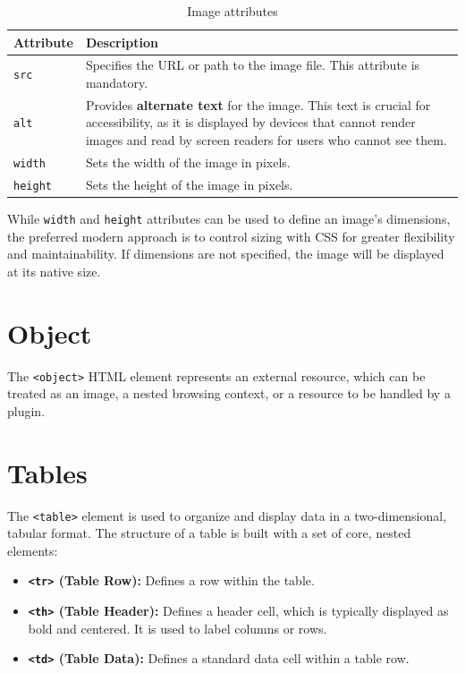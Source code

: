 \documentclass{scrbook}
\begin{document}
\begin{table}[h!]
    \centering
    \begin{tabularx}{\textwidth}{|p{5em}|X|} \hline
        \textbf{Attribute} & \textbf{Description} \\ \hline
    
        \texttt{src} & Specifies the URL or path to the image file. This attribute is mandatory. \\ \hline
    
        \texttt{alt} & Provides \textbf{alternate text} for the image. This text is crucial for accessibility, as it is displayed by devices that cannot render images and read by screen readers for users who cannot see them. \\ \hline
    
        \texttt{width} & Sets the width of the image in pixels. \\ \hline
    
        \texttt{height} & Sets the height of the image in pixels. \\ \hline
    \end{tabularx}
    \caption{Image attributes}
\end{table}

While \texttt{width} and \texttt{height} attributes can be used to define an image's dimensions, the preferred modern approach is to control sizing with CSS for greater flexibility and maintainability. If dimensions are not specified, the image will be displayed at its native size.

\section{Object}

The \texttt{<object>} HTML element represents an external resource, which can be treated as an image, a nested browsing context, or a resource to be handled by a plugin.

\section{Tables}

The \texttt{<table>} element is used to organize and display data in a two-dimensional, tabular format. The structure of a table is built with a set of core, nested elements:

\begin{itemize}
    \item
    \textbf{\texttt{<tr>} (Table Row):} Defines a row within the table.

    \item
    \textbf{\texttt{<th>} (Table Header):} Defines a header cell, which is typically displayed as bold and centered. It is used to label columns or rows.

    \item
    \textbf{\texttt{<td>} (Table Data):} Defines a standard data cell within a table row.
\end{itemize}
\end{document}
